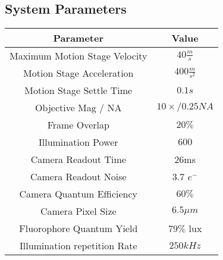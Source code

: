 \subsection{System Parameters}\label{sec:appendix:sys_param}
    \begin{center}
    \begin{tabular}{ | c | c |}
    \hline
    \textbf{Parameter} & \textbf{Value} \\
    \hline
    Maximum Motion Stage Velocity & $40\frac{m}{s}$ \\
    \hline
    Motion Stage Acceleration & $400 \frac{m}{s^2}$\\
    \hline
    Motion Stage Settle Time & $0.1s$\\
    \hline
    Objective Mag / NA& $10\times / 0.25NA$\\
    \hline
    Frame Overlap & $20\%$ \\
    \hline
    Illumination Power & $600$ \\
    \hline
    Camera Readout Time & 26ms\\
    \hline
    Camera Readout Noise & 3.7 $e^-$ \\
    \hline
    Camera Quantum Efficiency & $60\%$ \\
    \hline
    Camera Pixel Size & $6.5\mu m$\\
    \hline
    Fluorophore Quantum Yield& $79\%$ lux\\
    \hline
    Illumination repetition Rate & $250 kHz$\\
     \hline
    \end{tabular}
    \end{center}
